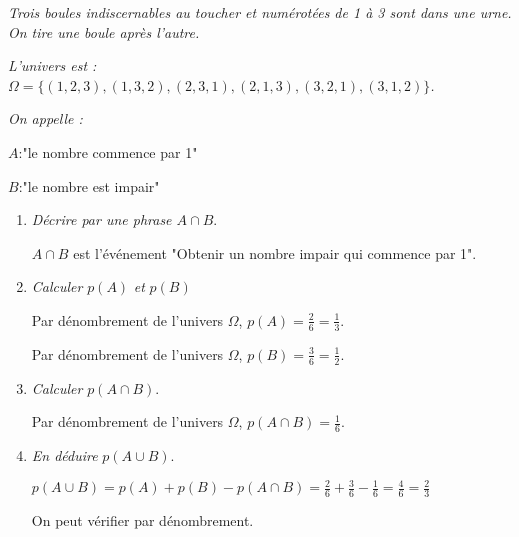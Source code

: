 \begin{Ex}
\textit{Trois boules indiscernables au toucher et numérotées de 1 à 3 sont dans une urne. On tire une boule après l'autre.}

\textit{L'univers est : $\Omega = \lbrace (1,2,3),(1,3,2),(2,3,1),(2,1,3),(3,2,1),(3,1,2)\rbrace$.}

\textit{On appelle :}
\begin{description}
\item $A$:"le nombre commence par 1"
\item $B$:"le nombre est impair"
\end{description}

\begin{enumerate}
\item \textit{Décrire par une phrase $A \cap B$}.

$A \cap B$ est l'événement "Obtenir un nombre impair qui commence par 1".

\item \emph{Calculer} $p(A)$ \textit{et}  $p(B)$

Par dénombrement de l'univers $\Omega$, $p(A) = \frac{2}{6}= \frac{1}{3}$.

Par dénombrement de l'univers $\Omega$, $p(B) = \frac{3}{6}= \frac{1}{2}$.
\item \textit{Calculer} $p(A \cap B)$.

Par dénombrement de l'univers $\Omega$, $p(A\cap B) = \frac{1}{6}$.

\item \textit{En déduire }$p(A \cup B)$. 

$p(A \cup B) = p(A)+p(B)-p(A\cap B) =  \frac{2}{6} +  \frac{3}{6} -  \frac{1}{6} =  \frac{4}{6}=  \frac{2}{3}$


On peut vérifier par dénombrement.
\end{enumerate}
\end{Ex}


